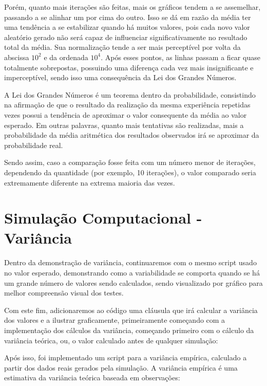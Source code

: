 Porém, quanto mais iterações são feitas, mais os gráficos tendem a se assemelhar, passando a se alinhar um por cima do outro. Isso se dá em razão da média ter uma tendência a se estabilizar quando há muitos valores, pois cada novo valor aleatório gerado não será capaz de influenciar significativamente no resultado total da média. Sua normalização tende a ser mais perceptível por volta da abscissa $10^2$ e da ordenada $10^4$. Após esses pontos, as linhas passam a ficar quase totalmente sobrepostas, possuindo uma diferença cada vez mais insignificante e imperceptível, sendo isso uma consequência da Lei dos Grandes Números.

A Lei dos Grandes Números é um teorema dentro da probabilidade, consistindo na afirmação de que o resultado da realização da mesma experiência repetidas vezes possui a tendência de aproximar o valor consequente da média ao valor esperado. Em outras palavras, quanto mais tentativas são realizadas, mais a probabilidade da média aritmética dos resultados observados irá se aproximar da probabilidade real.

Sendo assim, caso a comparação fosse feita com um número menor de iterações, dependendo da quantidade (por exemplo, 10 iterações), o valor comparado seria extremamente diferente na extrema maioria das vezes.


\section{Simulação Computacional - Variância}

Dentro da demonstração de variância, continuaremos com o mesmo script usado no valor esperado, demonstrando como a variabilidade se comporta quando se há um grande número de valores sendo calculados, sendo visualizado por gráfico para melhor compreensão visual dos testes.

Com este fim, adicionaremos ao código uma cláusula que irá calcular a variância dos valores e a ilustrar graficamente, primeiramente começando com a implementação dos cálculos da variância, começando primeiro com o cálculo da variância teórica, ou, o valor calculado antes de qualquer simulação:



Após isso, foi implementado um script para a variância empírica, calculado a partir dos dados reais gerados pela simulação. A variância empírica é uma estimativa da variância teórica baseada em observações:

